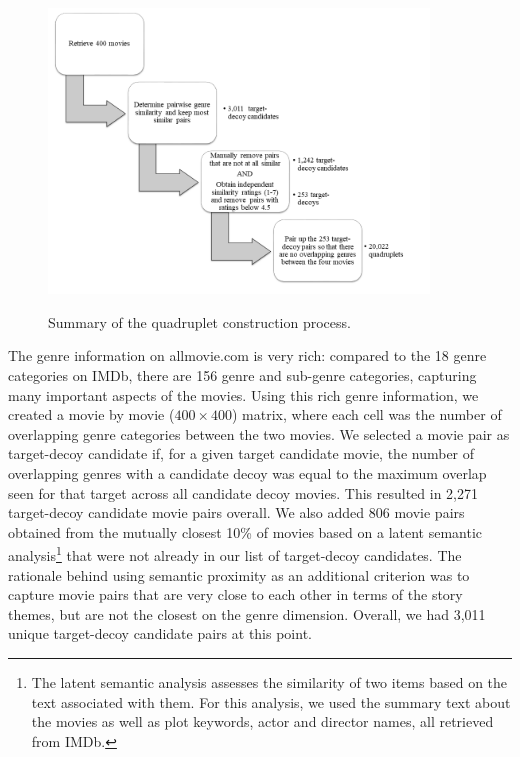 \documentclass[12pt, a4paper]{article}
\begin{document}
\begin{figure}[htb!]
\centering
		\caption{Summary of the quadruplet construction process. }
\includegraphics[width=0.9\textwidth]{flow.png}
\label{fig:flow}
\end{figure}

The genre information on allmovie.com is very rich: compared to the 18 genre categories on IMDb, there are 156 genre and sub-genre categories, capturing many important aspects of the movies. Using this rich genre information, we created a movie by movie ($400 \times 400$) matrix, where each cell was the number of overlapping genre categories between the two movies. We selected a movie pair as target-decoy candidate if, for a given target candidate movie, the number of overlapping genres with a candidate decoy was equal to the maximum overlap seen for that target across all candidate decoy movies. This resulted in 2,271 target-decoy candidate movie pairs overall.
We also added 806 movie pairs obtained from the mutually closest 10\% of movies based on a latent semantic analysis\footnote{The latent semantic analysis assesses the similarity of two items based on the text associated with them. For this analysis, we used the summary text about the movies as well as plot keywords, actor and director names, all retrieved from IMDb.} that were not already in our list of target-decoy candidates. The rationale behind using semantic proximity as an additional criterion was to capture movie pairs that are very close to each other in terms of the story themes, but are not the closest on the genre dimension. Overall, we had 3,011 unique target-decoy candidate pairs at this point.
\end{document}
